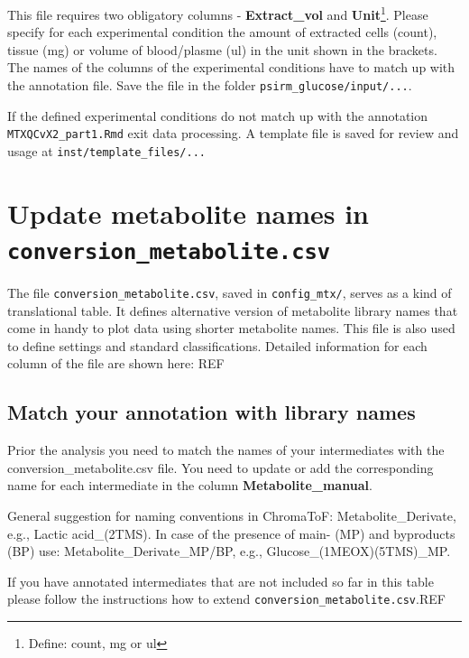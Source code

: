 \documentclass[]{book}
\let\rmarkdownfootnote\footnote%
\def\footnote{\protect\rmarkdownfootnote}
\theoremstyle{definition}
\theoremstyle{definition}
\theoremstyle{definition}
\theoremstyle{remark}
\begin{document}
This file requires two obligatory columns - \textbf{Extract\_vol} and
\textbf{Unit}\footnote{Define: count, mg or ul}. Please specify for each
experimental condition the amount of extracted cells (count), tissue
(mg) or volume of blood/plasme (ul) in the unit shown in the brackets.\\
The names of the columns of the experimental conditions have to match up
with the annotation file. Save the file in the folder
\texttt{psirm\_glucose/input/...}.

If the defined experimental conditions do not match up with the
annotation \texttt{MTXQCvX2\_part1.Rmd} exit data processing. A template
file is saved for review and usage at \texttt{inst/template\_files/...}

\section{\texorpdfstring{Update metabolite names in
\texttt{conversion\_metabolite.csv}}{Update metabolite names in conversion\_metabolite.csv}}\label{update-metabolite-names-in-conversion_metabolite.csv}

The file \texttt{conversion\_metabolite.csv}, saved in
\texttt{config\_mtx/}, serves as a kind of translational table. It
defines alternative version of metabolite library names that come in
handy to plot data using shorter metabolite names. This file is also
used to define settings and standard classifications. Detailed
information for each column of the file are shown here: REF

\subsection{Match your annotation with library
names}\label{match-your-annotation-with-library-names}

Prior the analysis you need to match the names of your intermediates
with the conversion\_metabolite.csv file. You need to update or add the
corresponding name for each intermediate in the column
\textbf{Metabolite\_manual}.

General suggestion for naming conventions in ChromaToF:
Metabolite\_Derivate, e.g., Lactic acid\_(2TMS). In case of the presence
of main- (MP) and byproducts (BP) use: Metabolite\_Derivate\_MP/BP,
e.g., Glucose\_(1MEOX)(5TMS)\_MP.

If you have annotated intermediates that are not included so far in this
table please follow the instructions how to extend
\texttt{conversion\_metabolite.csv}.REF
\end{document}
